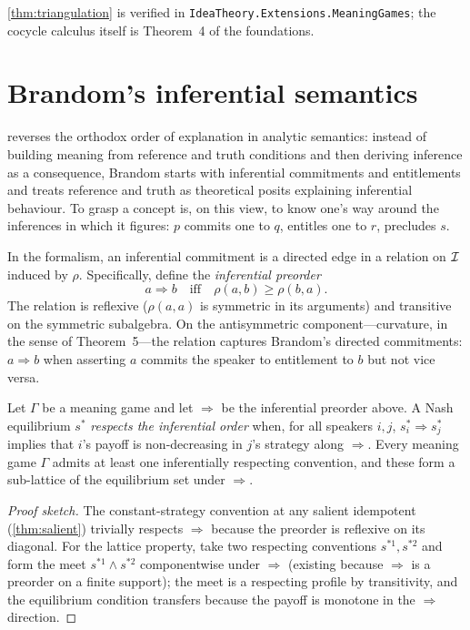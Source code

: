 \formalstatus \cref{thm:triangulation} is verified in
\texttt{IdeaTheory.Extensions.MeaningGames}; the cocycle calculus
itself is Theorem~4 of the foundations.

\section{Brandom's inferential semantics}\label{sec:brandom}

\cite{Brandom1994} reverses the orthodox order of explanation in
analytic semantics: instead of building meaning from reference and
truth conditions and then deriving inference as a consequence, Brandom
starts with inferential commitments and entitlements and treats
reference and truth as theoretical posits explaining inferential
behaviour. To grasp a concept is, on this view, to know one's way
around the inferences in which it figures: $p$ commits one to $q$,
entitles one to $r$, precludes $s$.

In the formalism, an inferential commitment is a directed edge in a
relation on $\mathcal{I}$ induced by $\rho$. Specifically, define the
\emph{inferential preorder}
\[
  a\Rightarrow b \quad\text{iff}\quad \rho(a,b)\geq\rho(b,a).
\]
The relation is reflexive ($\rho(a,a)$ is symmetric in its arguments)
and transitive on the symmetric subalgebra. On the antisymmetric
component---curvature, in the sense of Theorem~5---the relation
captures Brandom's directed commitments: $a\Rightarrow b$ when
asserting $a$ commits the speaker to entitlement to $b$ but not vice
versa.

\begin{theorem}\label{thm:brandom}
Let $\Gamma$ be a meaning game and let $\Rightarrow$ be the
inferential preorder above. A Nash equilibrium $s^\ast$ \emph{respects
the inferential order} when, for all speakers $i,j$,
$s^\ast_i\Rightarrow s^\ast_j$ implies that $i$'s payoff is
non-decreasing in $j$'s strategy along $\Rightarrow$. Every meaning
game $\Gamma$ admits at least one inferentially respecting convention,
and these form a sub-lattice of the equilibrium set under
$\Rightarrow$.
\end{theorem}

\begin{proof}[Proof sketch]
The constant-strategy convention at any salient idempotent
(\cref{thm:salient}) trivially respects $\Rightarrow$ because the
preorder is reflexive on its diagonal. For the lattice property,
take two respecting conventions $s^{\ast 1}, s^{\ast 2}$ and form
the meet $s^{\ast 1}\wedge s^{\ast 2}$ componentwise under
$\Rightarrow$ (existing because $\Rightarrow$ is a preorder on a finite
support); the meet is a respecting profile by transitivity, and the
equilibrium condition transfers because the payoff is monotone in the
$\Rightarrow$ direction.
\end{proof}

